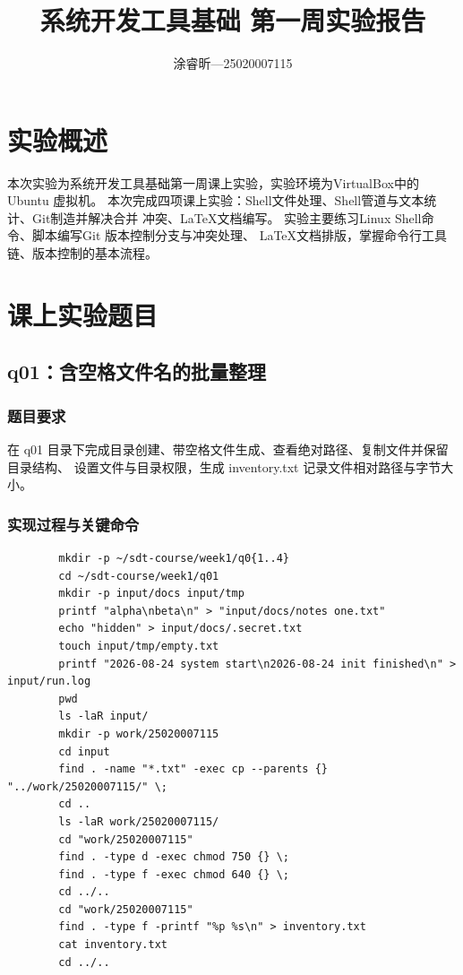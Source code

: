 \documentclass{article}
\title{系统开发工具基础 第一周实验报告}
\author{涂睿昕---25020007115}
\date{}
\begin{document}
	\maketitle
	
	\section{实验概述}
	本次实验为系统开发工具基础第一周课上实验，实验环境为VirtualBox中的Ubuntu
	虚拟机。
    本次完成四项课上实验：Shell文件处理、Shell管道与文本统计、Git制造并解决合并
	冲突、\LaTeX{}文档编写。
	实验主要练习Linux Shell命令、脚本编写Git 版本控制分支与冲突处理、
	\LaTeX{}文档排版，掌握命令行工具链、版本控制的基本流程。
	
	\section{课上实验题目}
	\subsection{q01：含空格文件名的批量整理}
	\subsubsection{题目要求}
	在 q01 目录下完成目录创建、带空格文件生成、查看绝对路径、复制文件并保留目录结构、
	设置文件与目录权限，生成 inventory.txt 记录文件相对路径与字节大小。
	
	\subsubsection{实现过程与关键命令}
	\begin{verbatim}
		mkdir -p ~/sdt-course/week1/q0{1..4}
		cd ~/sdt-course/week1/q01
		mkdir -p input/docs input/tmp
		printf "alpha\nbeta\n" > "input/docs/notes one.txt"
		echo "hidden" > input/docs/.secret.txt
		touch input/tmp/empty.txt
		printf "2026-08-24 system start\n2026-08-24 init finished\n" > input/run.log
		pwd
		ls -laR input/
		mkdir -p work/25020007115
		cd input
		find . -name "*.txt" -exec cp --parents {} "../work/25020007115/" \;
		cd ..
		ls -laR work/25020007115/
		cd "work/25020007115"
		find . -type d -exec chmod 750 {} \;
		find . -type f -exec chmod 640 {} \;
		cd ../..
		cd "work/25020007115"
		find . -type f -printf "%p %s\n" > inventory.txt
		cat inventory.txt
		cd ../..
	\end{verbatim}
	
\end{document}
